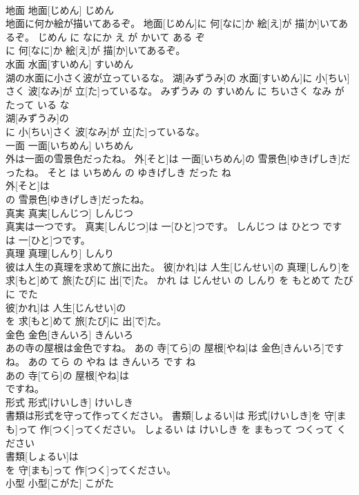 \documentclass[8pt]{extreport}
\begin{document}
\begin{CJK}{UTF8}{min}
\\	地面	地面[じめん]	じめん	
\\	地面に何か絵が描いてあるぞ。	地面[じめん]に 何[なに]か 絵[え]が 描[か]いてあるぞ。	じめん に なにか え が かいて ある ぞ	
\\	に 何[なに]か 絵[え]が 描[か]いてあるぞ。			
\\	水面	水面[すいめん]	すいめん	
\\	湖の水面に小さく波が立っているな。	湖[みずうみ]の 水面[すいめん]に 小[ちい]さく 波[なみ]が 立[た]っているな。	みずうみ の すいめん に ちいさく なみ が たって いる な	
\\	湖[みずうみ]の
\\	に 小[ちい]さく 波[なみ]が 立[た]っているな。			
\\	一面	一面[いちめん]	いちめん	
\\	外は一面の雪景色だったね。	外[そと]は 一面[いちめん]の 雪景色[ゆきげしき]だったね。	そと は いちめん の ゆきげしき だった ね	
\\	外[そと]は
\\	の 雪景色[ゆきげしき]だったね。			
\\	真実	真実[しんじつ]	しんじつ	
\\	真実は一つです。	真実[しんじつ]は 一[ひと]つです。	しんじつ は ひとつ です	
\\	は 一[ひと]つです。			
\\	真理	真理[しんり]	しんり	
\\	彼は人生の真理を求めて旅に出た。	彼[かれ]は 人生[じんせい]の 真理[しんり]を 求[もと]めて 旅[たび]に 出[で]た。	かれ は じんせい の しんり を もとめて たび に でた	
\\	彼[かれ]は 人生[じんせい]の
\\	を 求[もと]めて 旅[たび]に 出[で]た。			
\\	金色	金色[きんいろ]	きんいろ	
\\	あの寺の屋根は金色ですね。	あの 寺[てら]の 屋根[やね]は 金色[きんいろ]ですね。	あの てら の やね は きんいろ です ね	
\\	あの 寺[てら]の 屋根[やね]は
\\	ですね。			
\\	形式	形式[けいしき]	けいしき	
\\	書類は形式を守って作ってください。	書類[しょるい]は 形式[けいしき]を 守[まも]って 作[つく]ってください。	しょるい は けいしき を まもって つくって ください	
\\	書類[しょるい]は
\\	を 守[まも]って 作[つく]ってください。			
\\	小型	小型[こがた]	こがた	

\end{CJK}
\end{document}
